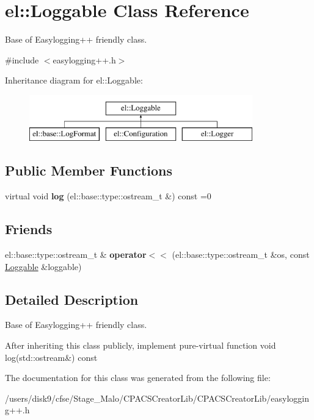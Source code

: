 \hypertarget{classel_1_1Loggable}{\section{el\-:\-:Loggable Class Reference}
\label{classel_1_1Loggable}
}


Base of Easylogging++ friendly class.  




{\ttfamily \#include $<$easylogging++.\-h$>$}

Inheritance diagram for el\-:\-:Loggable\-:\begin{figure}[H]
\begin{center}
\leavevmode
\includegraphics[height=2.000000cm]{classel_1_1Loggable}
\end{center}
\end{figure}
\subsection*{Public Member Functions}
\begin{DoxyCompactItemize}
\item 
\hypertarget{classel_1_1Loggable_ad8a2e0ebc11e4bd00ef49fc67db3d59e}{virtual void {\bfseries log} (el\-::base\-::type\-::ostream\-\_\-t \&) const =0}\label{classel_1_1Loggable_ad8a2e0ebc11e4bd00ef49fc67db3d59e}

\end{DoxyCompactItemize}
\subsection*{Friends}
\begin{DoxyCompactItemize}
\item 
\hypertarget{classel_1_1Loggable_a00722a386f498be3ebece2e266fb0f05}{el\-::base\-::type\-::ostream\-\_\-t \& {\bfseries operator$<$$<$} (el\-::base\-::type\-::ostream\-\_\-t \&os, const \hyperlink{classel_1_1Loggable}{Loggable} \&loggable)}\label{classel_1_1Loggable_a00722a386f498be3ebece2e266fb0f05}

\end{DoxyCompactItemize}


\subsection{Detailed Description}
Base of Easylogging++ friendly class. 

After inheriting this class publicly, implement pure-\/virtual function {\ttfamily void log(std\-::ostream\&) const} 

The documentation for this class was generated from the following file\-:\begin{DoxyCompactItemize}
\item 
/users/disk9/cfse/\-Stage\-\_\-\-Malo/\-C\-P\-A\-C\-S\-Creator\-Lib/\-C\-P\-A\-C\-S\-Creator\-Lib/easylogging++.\-h\end{DoxyCompactItemize}
